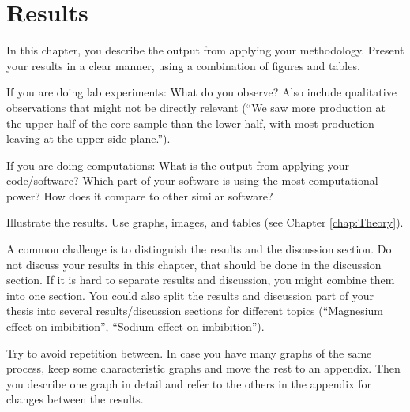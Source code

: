\chapter{Results}
\label{chap:Results}

In this chapter, you describe the output from applying your methodology. Present your results in a clear manner, using a combination of figures and tables.

If you are doing lab experiments: What do you observe? Also include qualitative observations that might not be directly relevant (“We saw more production at the upper half of the core sample than the lower half, with most production leaving at the upper side-plane.”).

If you are doing computations: What is the output from applying your code/software? Which part of your software is using the most computational power? How does it compare to other similar software?

Illustrate the results. Use graphs, images, and tables (see Chapter \ref{chap:Theory}).

A common challenge is to distinguish the results and the discussion section. Do not discuss your results in this chapter, that should be done in the discussion section. If it is hard to separate results and discussion, you might combine them into one section. You could also split the results and discussion part of your thesis into several results/discussion sections for different topics (“Magnesium effect on imbibition”, “Sodium effect on imbibition”).

Try to avoid repetition between. In case you have many graphs of the same process, keep some characteristic graphs and move the rest to an appendix. Then you describe one graph in detail and refer to the others in the appendix for changes between the results.